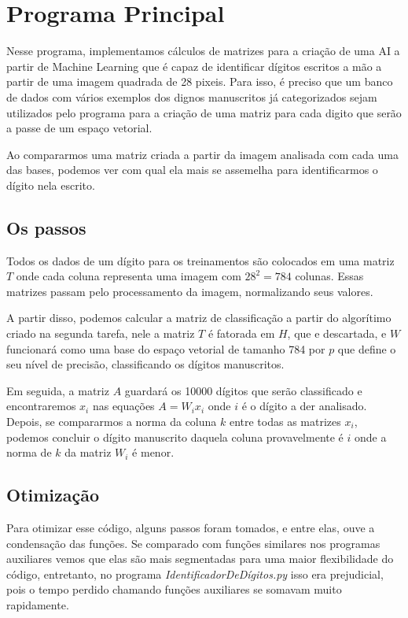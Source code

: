 \documentclass[a4paper, 12pt]{article}
\begin{document}
\section{Programa Principal}

    Nesse programa, implementamos cálculos de matrizes para a criação de uma AI a partir de Machine Learning que é capaz de identificar dígitos escritos a mão a partir de uma imagem quadrada de 28 pixeis.
    Para isso, é preciso que um banco de dados com vários exemplos dos dignos manuscritos já categorizados sejam utilizados pelo programa para a criação de uma matriz para cada digito que serão a passe de um espaço vetorial.

    Ao compararmos uma matriz criada a partir da imagem analisada com cada uma das bases, podemos ver com qual ela mais se assemelha para identificarmos o dígito nela escrito.

\subsection{Os passos}

    Todos os dados de um dígito para os treinamentos são colocados em uma matriz $T$ onde cada coluna representa uma imagem com $28^2 = 784$ colunas.
    Essas matrizes passam pelo processamento da imagem, normalizando seus valores.

    A partir disso, podemos calcular a matriz de classificação a partir do algorítimo criado na segunda tarefa, nele a matriz $T$ é fatorada em $H$, que e descartada, e $W$ funcionará como uma base do espaço vetorial de tamanho 784 por $p$ que define o seu nível de precisão, classificando os dígitos manuscritos.

    Em seguida, a matriz $A$ guardará os 10000 dígitos que serão classificado e encontraremos $x_{i}$ nas equações $A = W_{i} x_{i}$ onde $i$ é o dígito a der analisado.
    Depois, se compararmos a norma da coluna $k$ entre todas as matrizes $x_{i}$, podemos concluir o dígito manuscrito daquela coluna provavelmente é $i$ onde a norma de $k$ da matriz $W_{i}$ é menor.

\subsection{Otimização}

    Para otimizar esse código, alguns passos foram tomados, e entre elas, ouve a condensação das funções.
    Se comparado com funções similares nos programas auxiliares vemos que elas são mais segmentadas para uma maior flexibilidade do código, entretanto, no programa \textit{IdentificadorDeDígitos.py} isso era prejudicial, pois o tempo perdido chamando funções auxiliares se somavam muito rapidamente.
\end{document}
